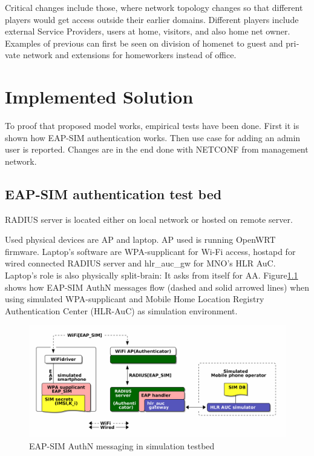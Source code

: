 \documentclass[12pt,a4paper,english]{tutthesis}
\begin{document}
\begin{otherlanguage}{english}
Critical changes include those, where network topology changes so
that different players would get access outside their earlier domains.
Different players include external Service Providers, users at home,
visitors, and also home net owner. Examples of previous can first be
seen on division of homenet to guest and private network and
extensions for homeworkers instead of office.







\chapter{Implemented Solution}
\label{sec-5}


To proof that proposed model works, empirical tests have been done.
First it is shown how EAP-SIM authentication works. Then use case for
adding an admin user is reported. Changes are in the end done with
NETCONF from management network.

\section{EAP-SIM authentication test bed}
\label{sec-5-1}
RADIUS server is located either on local network or hosted on remote
server.

Used physical devices are AP and laptop.  AP used is running OpenWRT
firmware.  Laptop's software are WPA-supplicant for Wi-Fi access,
hostapd for wired connected RADIUS server and hlr\_auc\_gw for MNO's
HLR AuC. Laptop's role is also physically split-brain: It asks from itself for AA. 
Figure\ref{eap-sim-testbed} shows how EAP-SIM AuthN messages flow (dashed
and solid arrowed lines) when using 
simulated WPA-supplicant and Mobile Home Location Registry Authentication Center (HLR-AuC) as simulation environment.

\begin{figure}[htb]
\centering
\includegraphics[width=.9\linewidth]{demoinfra.png}
\caption{\label{eap-sim-testbed}EAP-SIM AuthN messaging in simulation testbed}
\end{figure}





\end{otherlanguage}
\end{document}
